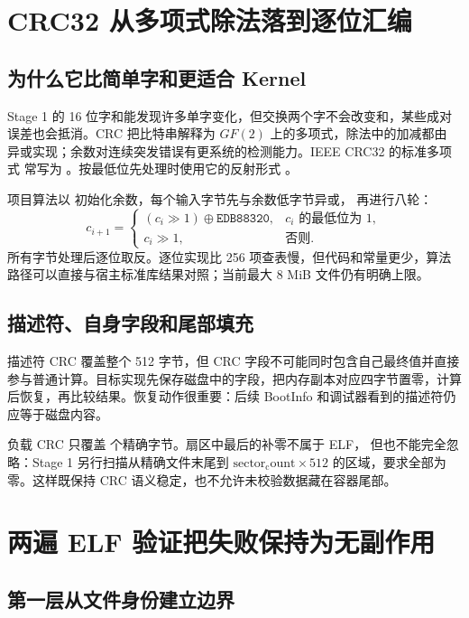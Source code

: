 \section{CRC32 从多项式除法落到逐位汇编}

\subsection{为什么它比简单字和更适合 Kernel}

Stage 1 的 16 位字和能发现许多单字变化，但交换两个字不会改变和，某些成对
误差也会抵消。CRC 把比特串解释为 \(GF(2)\) 上的多项式，除法中的加减都由
异或实现；余数对连续突发错误有更系统的检测能力。IEEE CRC32 的标准多项式
常写为 。按最低位先处理时使用它的反射形式
。

项目算法以  初始化余数，每个输入字节先与余数低字节异或，
再进行八轮：
\[
  c_{i+1}=
  \begin{cases}
    (c_i\gg1)\oplus\mathtt{EDB88320},&c_i\text{ 的最低位为 1},\\
    c_i\gg1,&\text{否则}.
  \end{cases}
\]
所有字节处理后逐位取反。逐位实现比 256 项查表慢，但代码和常量更少，算法
路径可以直接与宿主标准库结果对照；当前最大 8 MiB 文件仍有明确上限。

\subsection{描述符、自身字段和尾部填充}

描述符 CRC 覆盖整个 512 字节，但 CRC 字段不可能同时包含自己最终值并直接
参与普通计算。目标实现先保存磁盘中的字段，把内存副本对应四字节置零，计算
后恢复，再比较结果。恢复动作很重要：后续 BootInfo 和调试器看到的描述符仍
应等于磁盘内容。

负载 CRC 只覆盖  个精确字节。扇区中最后的补零不属于 ELF，
但也不能完全忽略：Stage 1 另行扫描从精确文件末尾到
\(\mathrm{sector_count}\times512\) 的区域，要求全部为零。这样既保持 CRC
语义稳定，也不允许未校验数据藏在容器尾部。

\section{两遍 ELF 验证把失败保持为无副作用}

\subsection{第一层从文件身份建立边界}

